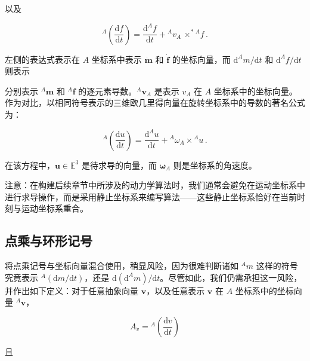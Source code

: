 \documentclass[10pt,a4paper]{book}
\theoremstyle{thmstyle} %
\theoremstyle{defstyle} %
\theoremstyle{prostyle} %
\begin{document}
以及



$$
{ } ^{A}  \left( \frac { \mathrm { d } f } { \mathrm { d } t } \right) = \frac { \mathrm { d } ^{A} f } { \mathrm { d } t } + { } ^{A}  v _ { A } \, \times ^{*} { } ^{A} f \, .
$$



左侧的表达式表示在 $A$ 坐标系中表示 $\dot{\boldsymbol{m}}$ 和 $\dot{\boldsymbol{f}}$ 的坐标向量，而 $\mathrm{d}^{A}m/\mathrm{d}t$ 和 $\mathrm{d}^{A}f/\mathrm{d}t$ 则表示



分别表示 ${}^{A}\boldsymbol{m}$ 和 ${}^{A}\boldsymbol{f}$ 的逐元素导数。${}^{A}\boldsymbol{v}_{A}$ 是表示 $v_{A}$ 在 $A$ 坐标系中的坐标向量。作为对比，以相同符号表示的三维欧几里得向量在旋转坐标系中的导数的著名公式为：



$$
{ } ^{A}  \left( \frac { \mathrm { d } u } { \mathrm { d } t } \right) = \frac { \mathrm { d } ^{A} u } { \mathrm { d } t } + { } ^{A}  \omega _ { A } \times { } ^{A} u \, .
$$



在该方程中，$\boldsymbol{u} \in \mathbb{E}^{3}$ 是待求导的向量，而 $\boldsymbol{\omega}_{A}$ 则是坐标系的角速度。



注意：在构建后续章节中所涉及的动力学算法时，我们通常会避免在运动坐标系中进行求导操作，而是采用静止坐标系来编写算法——这些静止坐标系恰好在当前时刻与运动坐标系重合。



\subsection{点乘与环形记号}





将点乘记号与坐标向量混合使用，稍显风险，因为很难判断诸如 $^{A}m$ 这样的符号究竟表示 $^{A}(\mathrm{d}m/\mathrm{d}t)$，还是 $\mathrm{d}(\mathrm{d}^{A}m)/\mathrm{d}t$。尽管如此，我们仍需承担这一风险，并作出如下定义：对于任意抽象向量 $\boldsymbol{v}$，以及任意表示 $\boldsymbol{v}$ 在 $A$ 坐标系中的坐标向量 $^{A}\boldsymbol{v}$，



$$
A _ { \dot { v } } = { } ^{A}  \left( { \frac { \mathrm { d } v } { \mathrm { d } t } } \right)
$$



且
\end{document}
